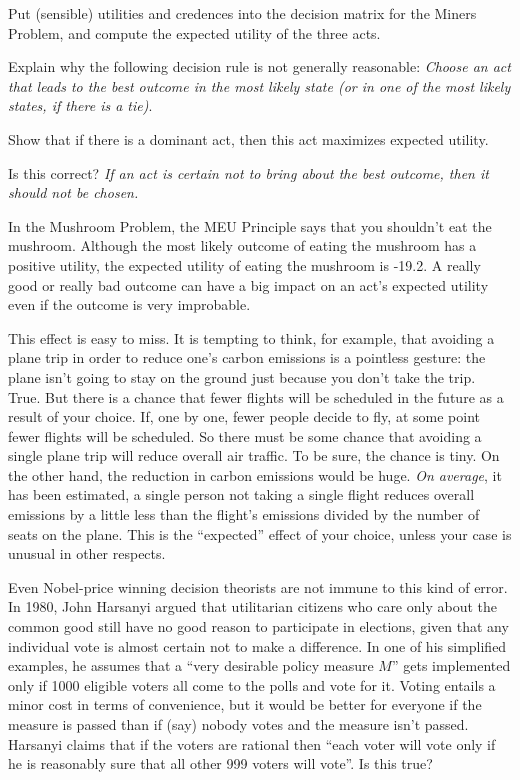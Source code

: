 \begin{exercise}{1}
  Put (sensible) utilities and credences into the decision matrix for the Miners
  Problem, and compute the expected utility of the three acts.
\end{exercise}

\begin{exercise}{2}
  Explain why the following decision rule is not generally reasonable:
  \emph{Choose an act that leads to the best outcome in the most likely state (or in one of the most likely states, if there is a tie)}.
\end{exercise}

\begin{exercise}{3}
  Show that if there is a dominant act, then this act maximizes
  expected utility.
\end{exercise}

\begin{exercise}{2}
  Is this correct? \emph{If an act is certain not to bring about the best
    outcome, then it should not be chosen.}
\end{exercise}

In the Mushroom Problem, the MEU Principle says that you shouldn't eat the
mushroom. Although the most likely outcome of eating the mushroom has a positive
utility, the expected utility of eating the mushroom is -19.2. A really good or
really bad outcome can have a big impact on an act's expected utility even if
the outcome is very improbable.

This effect is easy to miss. It is tempting to think, for example, that avoiding
a plane trip in order to reduce one's carbon emissions is a pointless gesture:
the plane isn't going to stay on the ground just because you don't take the
trip. True. But there is a chance that fewer flights will be scheduled in
the future as a result of your choice. If, one by one, fewer people decide to
fly, at some point fewer flights will be scheduled. So there must be some chance
that avoiding a single plane trip will reduce overall air traffic. To be sure,
the chance is tiny. On the other hand, the reduction in carbon emissions would
be huge. \emph{On average}, it has been estimated, a single person not taking a
single flight reduces overall emissions by a little less than the flight's
emissions divided by the number of seats on the plane. This is the ``expected''
effect of your choice, unless your case is unusual in other respects.

Even Nobel-price winning decision theorists are not immune to this kind of
error. In 1980, John Harsanyi argued that utilitarian citizens who care only
about the common good still have no good reason to participate in elections,
given that any individual vote is almost certain not to make a difference. In
one of his simplified examples, he assumes that a ``very desirable policy
measure $M$'' gets implemented only if 1000 eligible voters all come to the
polls and vote for it. Voting entails a minor cost in terms of convenience, but
it would be better for everyone if the measure is passed than if (say) nobody
votes and the measure isn't passed. Harsanyi claims that if the voters are
rational then ``each voter will vote only if he is reasonably sure that all
other 999 voters will vote''. Is this true?

